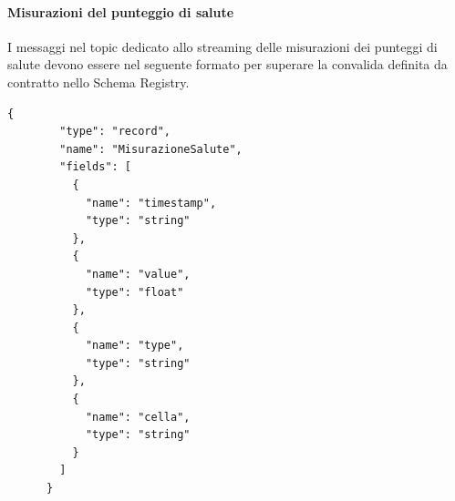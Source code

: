 \paragraph{Misurazioni del punteggio di salute}
I messaggi nel topic dedicato allo streaming delle misurazioni dei punteggi di salute devono essere nel seguente formato per superare la convalida definita da contratto nello Schema Registry.
\begin{lstlisting}[style=code]
    {
        "type": "record",
        "name": "MisurazioneSalute",
        "fields": [
          {
            "name": "timestamp",
            "type": "string"
          },
          {
            "name": "value",
            "type": "float"
          },
          {
            "name": "type",
            "type": "string"
          },
          {
            "name": "cella",
            "type": "string"
          }
        ]
      }
    \end{lstlisting}